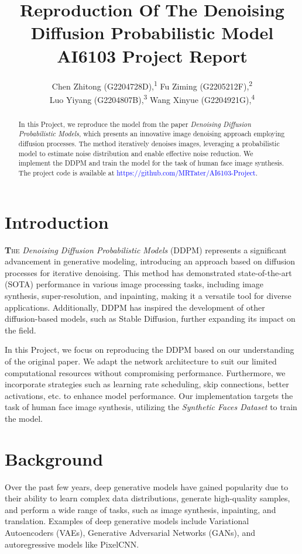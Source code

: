 \documentclass[letterpaper]{article} %
\title{Reproduction Of The Denoising Diffusion Probabilistic Model \\ AI6103 Project Report}
\author {
    Chen Zhitong (G2204728D),\textsuperscript{\rm 1}
    Fu Ziming (G2205212F),\textsuperscript{\rm 2}\\
    Luo Yiyang (G2204807B),\textsuperscript{\rm 3}
    Wang Xinyue (G2204921G),\textsuperscript{\rm 4}
}
\begin{document}
\maketitle

\begin{abstract}
In this Project, we reproduce the model from the paper \textit{Denoising Diffusion Probabilistic Models}, which presents an innovative image denoising approach employing diffusion processes. The method iteratively denoises images, leveraging a probabilistic model to estimate noise distribution and enable effective noise reduction. We implement the DDPM and train the model for the task of human face image synthesis. The project code is available at \textcolor{blue}{https://github.com/MRTater/AI6103-Project}.
\end{abstract}

\section{Introduction}
\lettrine[lines=2, findent=3pt, nindent=0pt]{\textbf{T}}{he} \textit{Denoising Diffusion Probabilistic Models} (DDPM) represents a significant advancement in generative modeling, introducing an approach based on diffusion processes for iterative denoising. This method has demonstrated state-of-the-art (SOTA) performance in various image processing tasks, including image synthesis, super-resolution, and inpainting, making it a versatile tool for diverse applications. Additionally, DDPM has inspired the development of other diffusion-based models, such as Stable Diffusion, further expanding its impact on the field.

In this Project, we focus on reproducing the DDPM based on our understanding of the original paper. We adapt the network architecture to suit our limited computational resources without compromising performance. Furthermore, we incorporate strategies such as learning rate scheduling, skip connections, better activations, etc. to enhance model performance. Our implementation targets the task of human face image synthesis, utilizing the \textit{Synthetic Faces Dataset} to train the model.

\section{Background}
Over the past few years, deep generative models have gained popularity due to their ability to learn complex data distributions, generate high-quality samples, and perform a wide range of tasks, such as image synthesis, inpainting, and translation. Examples of deep generative models include Variational Autoencoders (VAEs), Generative Adversarial Networks (GANs), and autoregressive models like PixelCNN.
\end{document}
